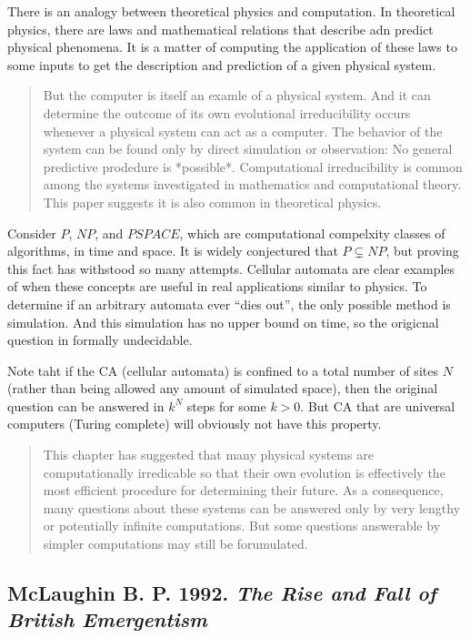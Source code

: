 \documentclass{article}
\newcommand{\ti}[1]{\textit{#1}}
\newcommand{\annbibtitle}[2]{\subsection*{#1. \ti{#2}}}
\begin{document}
There is an analogy between theoretical physics and computation. In theoretical physics, there are laws and mathematical relations that describe adn predict physical phenomena. It is a matter of computing the application of these laws to some inputs to get the description and prediction of a given physical system.

\begin{quote}
But the computer is itself an examle of a physical system. And it can determine the outcome of its own evolutional irreducibility occurs whenever a physical system can act as a computer. The behavior of the system can be found only by direct simulation or observation: No general predictive prodedure is *possible*. Computational irreducibility is common among the systems investigated in mathematics and computational theory. This paper suggests it is also common in theoretical physics.
\end{quote}

Consider $P$, $NP$, and $PSPACE$, which are computational compelxity classes of algorithms, in time and space. It is widely conjectured that $P \subsetneq NP$, but proving this fact has withstood so many attempts. Cellular automata are clear examples of when these concepts are useful in real applications similar to physics. To determine if an arbitrary automata ever ``dies out'', the only possible method is simulation. And this simulation has no upper bound on time, so the origicnal question in formally undecidable.

Note taht if the CA (cellular automata) is confined to a total number of sites $N$ (rather than being allowed any amount of simulated space), then the original question can be answered in $k^N$ steps for some $k > 0$. But CA that are universal computers (Turing complete) will obviously not have this property.

\begin{quote}
This chapter has suggested that many physical systems are computationally irredicable so that their own evolution is effectively the most efficient procedure for determining their future. As a consequence, many questions about these systems can be answered only by very lengthy or potentially infinite computations. But some questions answerable by simpler computations may still be forumulated.
\end{quote}

\annbibtitle{McLaughin B. P. 1992}{The Rise and Fall of British Emergentism}
\end{document}
